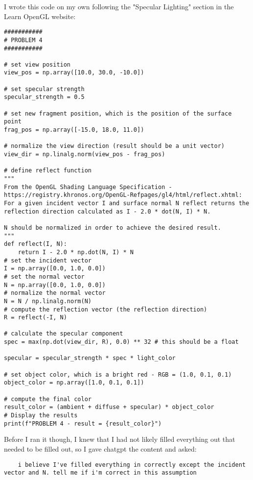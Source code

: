 \documentclass{article}
\begin{document}
I wrote this code on my own following the "Specular Lighting" section in the Learn OpenGL website: 
\begin{verbatim}
###########
# PROBLEM 4
###########

# set view position
view_pos = np.array([10.0, 30.0, -10.0])

# set specular strength
specular_strength = 0.5

# set new fragment position, which is the position of the surface point
frag_pos = np.array([-15.0, 18.0, 11.0])

# normalize the view direction (result should be a unit vector)
view_dir = np.linalg.norm(view_pos - frag_pos)

# define reflect function 
"""
From the OpenGL Shading Language Specification - https://registry.khronos.org/OpenGL-Refpages/gl4/html/reflect.xhtml:
For a given incident vector I and surface normal N reflect returns the reflection direction calculated as I - 2.0 * dot(N, I) * N.

N should be normalized in order to achieve the desired result.
"""
def reflect(I, N):
    return I - 2.0 * np.dot(N, I) * N
# set the incident vector
I = np.array([0.0, 1.0, 0.0]) 
# set the normal vector
N = np.array([0.0, 1.0, 0.0]) 
# normalize the normal vector
N = N / np.linalg.norm(N) 
# compute the reflection vector (the reflection direction)
R = reflect(-I, N)

# calculate the specular component
spec = max(np.dot(view_dir, R), 0.0) ** 32 # this should be a float

specular = specular_strength * spec * light_color

# set object color, which is a bright red - RGB = (1.0, 0.1, 0.1)
object_color = np.array([1.0, 0.1, 0.1])

# compute the final color
result_color = (ambient + diffuse + specular) * object_color
# Display the results
print(f"PROBLEM 4 - result = {result_color}")
\end{verbatim}

Before I ran it though, I knew that I had not likely filled everything out that needed to be filled out, so I gave chatgpt the content and asked: 
\begin{verbatim}
    i believe I've filled everything in correctly except the incident vector and N. tell me if i'm correct in this assumption
\end{verbatim}
\end{document}
